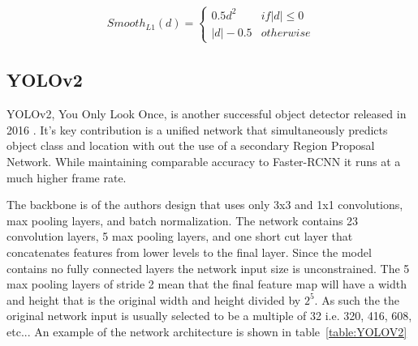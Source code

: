 \begin{align}
    Smooth_{L1}(d) = \begin{cases}
      0.5d^2 & if |d| \leq 0 \\
      |d| - 0.5 & otherwise
   \end{cases}
\end{align}

\subsection{YOLOv2}

YOLOv2, You Only Look Once, is another successful object detector released in 2016 \cite{YOLOv2}. It's key contribution is a unified network that simultaneously predicts object class and location with out the use of a secondary Region Proposal Network. While maintaining comparable accuracy to Faster-RCNN it runs at a much higher frame rate.

The backbone is of the authors design that uses only 3x3 and 1x1 convolutions, max pooling layers, and batch normalization. The network contains 23 convolution layers, 5 max pooling layers, and one short cut layer that concatenates features from lower levels to the final layer. Since the model contains no fully connected layers the network input size is unconstrained. The 5 max pooling layers of stride 2 mean that the final feature map will have a width and height that is the original width and height divided by $2^5$. As such the the original network input is usually selected to be a multiple of 32 i.e. 320, 416, 608, etc... An example of the network architecture is shown in table~\ref{table:YOLOV2}

